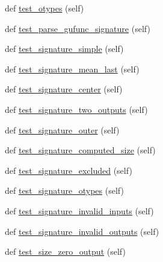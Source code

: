 \begin{DoxyCompactItemize}
\item 
def \hyperlink{classnumpy_1_1lib_1_1tests_1_1test__function__base_1_1TestVectorize_a53c8daab00d554e5cae833b7ebfca0d8}{test\+\_\+otypes} (self)
\item 
def \hyperlink{classnumpy_1_1lib_1_1tests_1_1test__function__base_1_1TestVectorize_ab3856f3c99d3e99e1e150df322d3a44a}{test\+\_\+parse\+\_\+gufunc\+\_\+signature} (self)
\item 
def \hyperlink{classnumpy_1_1lib_1_1tests_1_1test__function__base_1_1TestVectorize_a7dbddcbb77a5dbacf0b3bc47f96c3a7a}{test\+\_\+signature\+\_\+simple} (self)
\item 
def \hyperlink{classnumpy_1_1lib_1_1tests_1_1test__function__base_1_1TestVectorize_ada78fef68a4da76c92c5c8078e90180c}{test\+\_\+signature\+\_\+mean\+\_\+last} (self)
\item 
def \hyperlink{classnumpy_1_1lib_1_1tests_1_1test__function__base_1_1TestVectorize_afb63eec83ee573f4d48e214631e35653}{test\+\_\+signature\+\_\+center} (self)
\item 
def \hyperlink{classnumpy_1_1lib_1_1tests_1_1test__function__base_1_1TestVectorize_aef0f068bbd1cfd2afd2e3d0f2fb4eb9a}{test\+\_\+signature\+\_\+two\+\_\+outputs} (self)
\item 
def \hyperlink{classnumpy_1_1lib_1_1tests_1_1test__function__base_1_1TestVectorize_a88f6c2135f8038188b786d3f9e0807f4}{test\+\_\+signature\+\_\+outer} (self)
\item 
def \hyperlink{classnumpy_1_1lib_1_1tests_1_1test__function__base_1_1TestVectorize_a83d322b4efb1466f22bd6e6675067aaf}{test\+\_\+signature\+\_\+computed\+\_\+size} (self)
\item 
def \hyperlink{classnumpy_1_1lib_1_1tests_1_1test__function__base_1_1TestVectorize_a98dc7d743a9471f19aa81eea8642c68a}{test\+\_\+signature\+\_\+excluded} (self)
\item 
def \hyperlink{classnumpy_1_1lib_1_1tests_1_1test__function__base_1_1TestVectorize_a60dd42138ce5d9fc7e939f4ae47b3ce3}{test\+\_\+signature\+\_\+otypes} (self)
\item 
def \hyperlink{classnumpy_1_1lib_1_1tests_1_1test__function__base_1_1TestVectorize_a38358139578670757b726bc7610cca91}{test\+\_\+signature\+\_\+invalid\+\_\+inputs} (self)
\item 
def \hyperlink{classnumpy_1_1lib_1_1tests_1_1test__function__base_1_1TestVectorize_a0d10832925f342d71d7b520bac8ca927}{test\+\_\+signature\+\_\+invalid\+\_\+outputs} (self)
\item 
def \hyperlink{classnumpy_1_1lib_1_1tests_1_1test__function__base_1_1TestVectorize_a2ec092ee4411914b77b992b35527149e}{test\+\_\+size\+\_\+zero\+\_\+output} (self)
\end{DoxyCompactItemize}


